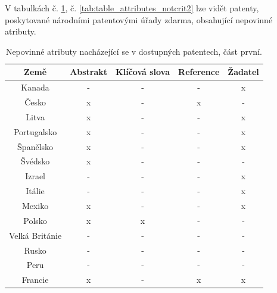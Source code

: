 \noindent V tabulkách č. \ref{tab:table_attributes_notcrit1}, č. \ref{tab:table_attributes_notcrit2} lze vidět patenty, poskytované národními patentovými úřady zdarma, obsahující nepovinné atributy.
	\begin{table}[H]
	\centering
	\begin{tabular}{|c|c|c|c|c|} 
	\hline
	\textbf{Země}    & \textbf{Abstrakt} & \textbf{Klíčová slova} & \textbf{Reference} & \textbf{Žadatel} \\
	\hline
	Kanada & - & - & - & x \\
	\hline
	Česko & x & - & x & - \\
	\hline
	Litva & x & - & - & x \\
	\hline
	Portugalsko & x & - & - & x \\
	\hline
	Španělsko & x & - & - & x \\
	\hline
	Švédsko & x & - & - & - \\
	\hline
	Izrael & - & - & - & x \\
	\hline
	Itálie & - & - & - & x \\
	\hline
	Mexiko & x & - & - & x \\
	\hline
	Polsko & x & x & - & - \\
	\hline
	Velká Británie & - & - & - & - \\
	\hline
	Rusko & - & - & - & - \\
	\hline
	Peru & - & - & - & - \\
	\hline
	Francie & x & - & x & x \\
	\hline
	\end{tabular}
	\caption{Nepovinné atributy nacházející se v dostupných patentech, část první.}
	\label{tab:table_attributes_notcrit1}
	\end{table}


